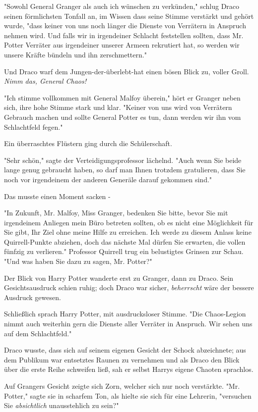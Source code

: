 {"Sowohl General Granger als auch ich wünschen zu verkünden," schlug Draco seinen förmlichsten Tonfall an, im Wissen dass seine Stimme verstärkt und gehört wurde, "dass keiner von uns noch länger die Dienste von Verrätern in Anspruch nehmen wird. Und falls wir in irgendeiner Schlacht feststellen sollten, dass Mr. Potter Verräter aus irgendeiner unserer Armeen rekrutiert hat, so werden wir unsere Kräfte bündeln und ihn zerschmettern."

Und Draco warf dem Jungen-der-überlebt-hat einen bösen Blick zu, voller Groll. \emph{Nimm das, General Chaos!}

"Ich stimme vollkommen mit General Malfoy überein," hört er Granger neben sich, ihre hohe Stimme stark und klar. "Keiner von uns wird von Verrätern Gebrauch machen und sollte General Potter es tun, dann werden wir ihn vom Schlachtfeld fegen."

Ein überraschtes Flüstern ging durch die Schülerschaft.

"Sehr schön," sagte der Verteidigungsprofessor lächelnd. "Auch wenn Sie beide lange genug gebraucht haben, so darf man Ihnen trotzdem gratulieren, dass Sie noch vor irgendeinem der anderen Generäle darauf gekommen sind."

Das musste einen Moment sacken -

"In Zukunft, Mr. Malfoy, Miss Granger, bedenken Sie bitte, bevor Sie mit irgendeinem Anliegen mein Büro betreten sollten, ob es nicht eine Möglichkeit für Sie gibt, Ihr Ziel ohne meine Hilfe zu erreichen. Ich werde zu diesem Anlass keine Quirrell-Punkte abziehen, doch das nächste Mal dürfen Sie erwarten, die vollen fünfzig zu verlieren." Professor Quirrell trug ein belustigtes Grinsen zur Schau. "Und was haben Sie dazu zu sagen, Mr. Potter?"

Der Blick von Harry Potter wanderte erst zu Granger, dann zu Draco. Sein Gesichtsausdruck schien ruhig; doch Draco war sicher, \emph{beherrscht} wäre der bessere Ausdruck gewesen.

Schließlich sprach Harry Potter, mit ausdrucksloser Stimme. "Die Chaos-Legion nimmt auch weiterhin gern die Dienste aller Verräter in Anspruch. Wir sehen uns auf dem Schlachtfeld."

Draco wusste, dass sich auf seinem eigenen Gesicht der Schock abzeichnete; aus dem Publikum war entsetztes Raunen zu vernehmen und als Draco den Blick über die erste Reihe schweifen ließ, sah er selbst Harrys eigene Chaoten sprachlos.

Auf Grangers Gesicht zeigte sich Zorn, welcher sich nur noch verstärkte. "Mr. Potter," sagte sie in scharfem Ton, als hielte sie sich für eine Lehrerin, "versuchen Sie \emph{absichtlich} unausstehlich zu sein?"

}
